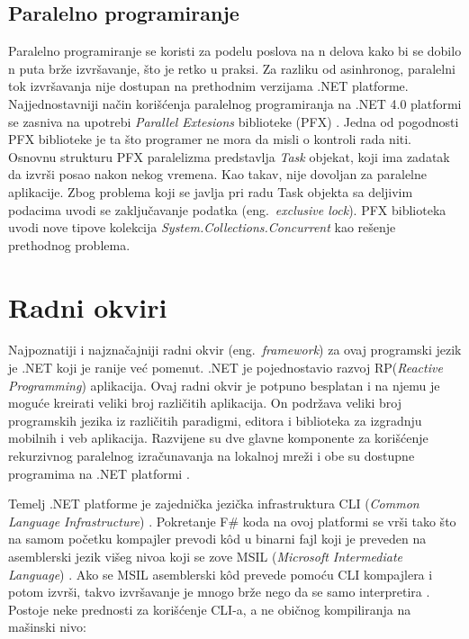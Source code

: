 \documentclass[a4paper]{article}
\begin{document}
\subsection{Paralelno programiranje}

Paralelno programiranje se koristi za podelu poslova na n delova kako bi se dobilo n puta brže izvršavanje, što je retko u praksi. Za razliku od asinhronog, paralelni tok izvršavanja nije dostupan na prethodnim verzijama .NET platforme. Najjednostavniji način korišćenja paralelnog programiranja na .NET 4.0 platformi se zasniva na upotrebi {\em Parallel Extesions} biblioteke (PFX) \cite{progFs}. Jedna od pogodnosti PFX biblioteke je ta što programer ne mora da misli o kontroli rada niti.  Osnovnu strukturu PFX paralelizma predstavlja {\em Task} objekat, koji ima zadatak da izvrši posao nakon nekog vremena. Kao takav, nije dovoljan za paralelne aplikacije. Zbog problema koji se javlja pri radu Task objekta sa deljivim podacima uvodi se zaključavanje podatka (eng.~{\em exclusive lock}). PFX biblioteka uvodi nove tipove kolekcija {\em System.Collections.Concurrent} \cite{sysCC} kao rešenje prethodnog problema.  


\section{Radni okviri}
\label{sec:radni_okviri}

Najpoznatiji i najznačajniji radni okvir (eng.~{\em framework}) za ovaj programski jezik je .NET koji je ranije već pomenut. .NET je pojednostavio razvoj RP({\em Reactive Programming}) \cite{RPapp} aplikacija. Ovaj radni okvir je potpuno besplatan i na njemu je moguće kreirati veliki broj različitih aplikacija. On podržava veliki broj programskih jezika iz različitih paradigmi, editora i biblioteka za izgradnju mobilnih i veb aplikacija. Razvijene su dve glavne komponente za korišćenje rekurzivnog paralelnog izračunavanja na lokalnoj mreži i obe su dostupne programima na .NET platformi \cite{ppNETframework}. 

Temelj .NET platforme je zajednička jezička infrastruktura CLI ({\em Common Language Infrastructure}) \cite{cli}. Pokretanje F\# koda na ovoj platformi se vrši tako što na samom početku kompajler prevodi kôd u binarni fajl koji je preveden na asemblerski jezik višeg nivoa koji se zove MSIL ({\em Microsoft Intermediate Language}) \cite{msil}. Ako se MSIL asemblerski kôd prevede pomoću CLI kompajlera i potom izvrši, takvo izvršavanje je mnogo brže nego da se samo interpretira \cite{progFs}.
Postoje neke prednosti za korišćenje CLI-a, a ne običnog kompiliranja na mašinski nivo:	\\
\end{document}
